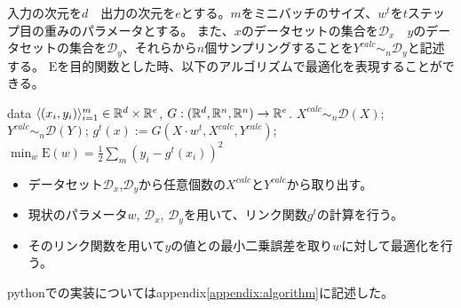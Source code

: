入力の次元を$ d $　出力の次元を$ e $とする。$ m $をミニバッチのサイズ、$ w^t $を$t$ステップ目の重みのパラメータとする。
また、$x$のデータセットの集合を$ \mathcal{D}_x $　$y$のデータセットの集合を$ \mathcal{D}_y $、それらから$n$個サンプリングすることを$ Y^{calc} \sim_n \mathcal{D}_y $と記述する。
$ \mathrm{E} $を目的関数とした時、以下のアルゴリズムで最適化を表現することができる。



\begin{algorithm}[]
	\caption{\KAF}
	\label{alg:fixed-u-alg}
\begin{algorithmic}
	 data $\langle (x_i, y_i) \rangle_{i=1}^m \in
	\mathbb{R}^d \times \mathbb{R}^e$, $G: ( \mathbb{R}^d, \mathbb{R}^n, \mathbb{R}^n ) \rightarrow  \mathbb{R}^e$.
	\STATE $X^{calc} \sim_n \mathcal{D}(X)$;
    \STATE $Y^{calc} \sim_n \mathcal{D}(Y)$;
	\STATE $g^t(x) := G(X \cdot w^t, X^{calc}, Y^{calc} )$;
	\STATE $ \displaystyle{\min_{w} \mathrm{E}(w)} = \frac{1}{2}\sum_m (y_i - g^t(x_i))^2 $
	\ENDFOR
\end{algorithmic}
\end{algorithm}

\begin{itemize}
  \item データセット$\mathcal{D}_x$,$\mathcal{D}_y$から任意個数の$ X^{calc} $と$ Y^{calc} $から取り出す。
  \item 現状のパラメータ$ w $, $\mathcal{D}_x$, $\mathcal{D}_y$を用いて、リンク関数$ g^t $の計算を行う。
  \item そのリンク関数を用いて$ y $の値との最小二乗誤差を取り$ w $に対して最適化を行う。
\end{itemize}


pythonでの実装についてはappendix\ref{appendix:algorithm}に記述した。






